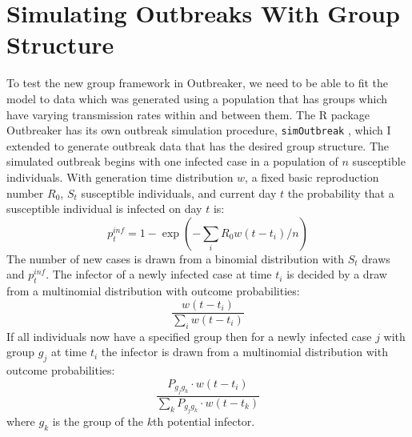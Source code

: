 \documentclass[11pt,a4paper]{report}
\begin{document}
\section{Simulating Outbreaks With Group Structure}
To test the new group framework in Outbreaker, we need to be able to fit the model to data which was generated using a population that has groups which have varying transmission rates within and between them. The R package Outbreaker has its own outbreak simulation procedure, {\tt simOutbreak} \citep{outbrkr}, which I extended to generate outbreak data that has the desired group structure. The simulated outbreak begins with one infected case in a population of $n$ susceptible individuals. With generation time distribution $w$, a fixed basic reproduction number $R_0$, $S_t$ susceptible individuals, and current day $t$ the probability that a susceptible individual is infected on day $t$ is:
\begin{equation}
p^{inf}_t = 1 - \exp{(-\sum_{i} R_{0}w(t-t_i)/n)}
\end{equation}  
The number of new cases is drawn from a binomial distribution with $S_t$ draws and $p^{inf}_t$. The infector of a newly infected case at time $t_i$ is decided by a draw from a multinomial distribution with outcome probabilities: 
\begin{equation}
 \frac{w(t-t_i)}{\sum_i{w(t-t_i)}}
\end{equation}
If all individuals now have a specified group then for a newly infected case $j$ with group $g_j$ at time $t_i$ the infector is drawn from a multinomial distribution with outcome probabilities:
\begin{equation}
 \frac{P_{g_{j}g_{k}} \cdot w(t-t_i)}{\sum_k{P_{g_{j}g_{k}} \cdot w(t-t_k)}}
\end{equation}
where $g_{k}$ is the group of the $k$th potential infector.
\end{document}
